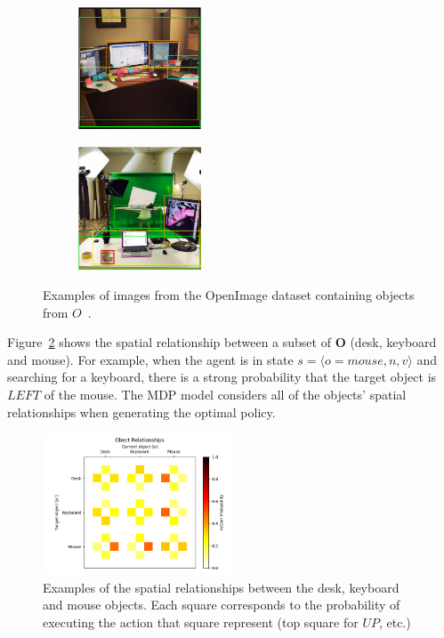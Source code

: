 \documentclass[a4paper, twoside]{article}
\begin{document}
\begin{figure}
  \centering
  \begin{subfigure}
    \centering
    \includegraphics[width=0.4\textwidth]{figures/desk_example.png}
  \end{subfigure}
  \begin{subfigure}
    \centering
    \includegraphics[width=0.4\textwidth]{figures/mug_example.png}
  \end{subfigure}
  \caption{Examples of images from the OpenImage dataset containing objects from $\mathit{O}$~\cite{openimages}. }\label{fig:openimage-example}
\end{figure}

Figure~\ref{fig:obj-relationships} shows the spatial relationship between a subset of $\mathbf{O}$ (desk, keyboard and mouse). For example, when the agent is in state $s=\langle{}o=mouse, n, v\rangle$ and searching for a keyboard, there is a strong probability that the target object is $LEFT$ of the mouse. The MDP model considers all of the objects' spatial relationships when generating the optimal policy.

\begin{figure}
  \centering
  \includegraphics[width=0.5\textwidth]{figures/object_relationships.png}
  \caption{Examples of the spatial relationships between the desk, keyboard and mouse objects. Each square corresponds to the probability of executing the action that square represent (top square for $UP$, etc.)}\label{fig:obj-relationships}
\end{figure}
\end{document}
